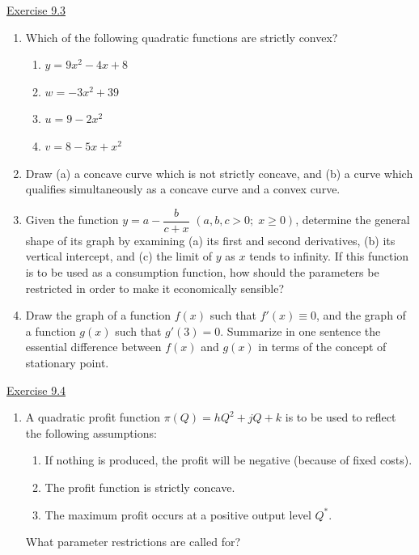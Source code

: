 \underline{Exercise 9.3}
\begin{enumerate}
\item[2.] Which of the following quadratic functions are strictly convex?
\begin{enumerate}
\item[(a)] $y = 9x^{2} - 4x + 8$
\item[(b)] $w = -3x^{2} + 39$
\item[(c)] $u = 9 - 2x^{2}$
\item[(d)] $v = 8 - 5x + x^{2}$
\end{enumerate}

\item[3.] Draw (a) a concave curve which is not strictly concave, and (b) a curve which qualifies simultaneously as a concave curve and a convex curve.

\item[4.] Given the function $y = a - \dfrac{b}{c + x}$ $(a, b, c > 0;\; x \geq 0)$, determine the general shape of its graph by examining (a) its first and second derivatives, (b) its vertical intercept, and (c) the limit of $y$ as $x$ tends to infinity. If this function is to be used as a consumption function, how should the parameters be restricted in order to make it economically sensible?

\item[5.] Draw the graph of a function $f(x)$ such that $f'(x) \equiv 0$, and the graph of a function $g(x)$ such that $g'(3) = 0$. Summarize in one sentence the essential difference between $f(x)$ and $g(x)$ in terms of the concept of stationary point.

\end{enumerate}

\underline{Exercise 9.4}
\begin{enumerate}
\item[5.] A quadratic profit function $\pi(Q) = hQ^{2} + jQ + k$ is to be used to reflect the following assumptions:
\begin{enumerate}
\item[(a)] If nothing is produced, the profit will be negative (because of fixed costs).
\item[(b)] The profit function is strictly concave.
\item[(c)] The maximum profit occurs at a positive output level $Q^{*}$.
\end{enumerate}
What parameter restrictions are called for?

\end{enumerate}
